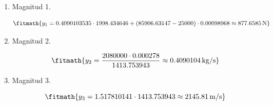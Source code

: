 \begin{enumerate}

\item Magnitud 1.

\[\fitmath{y_{1}=0.4090103535\cdot 1998.434646+\left(85906.63147-25000\right)\cdot 0.00098968\approx 877.6585\,\mathrm{N}}\]

\item Magnitud 2.

\[\fitmath{y_{2}=\frac{2080000\cdot 0.000278}{1413.753943}\approx 0.4090104\,\mathrm{kg/s}}\]

\item Magnitud 3.

\[\fitmath{y_{3}=1.517810141\cdot 1413.753943\approx 2145.81\,\mathrm{m/s}}\]

\end{enumerate}

